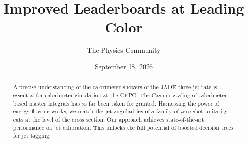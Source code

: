 \documentclass[11pt]{article}
\title{Improved Leaderboards at Leading Color}
\author{The Physics Community}
\date{September 18, 2026}
\numberwithin{equation}{section}
\theoremstyle{definition}
\theoremstyle{remark}
\begin{document}
\maketitle
\begin{abstract}
A precise understanding of the calorimeter showers of the JADE three-jet
rate is essential for calorimeter simulation at the CEPC. The Casimir
scaling of calorimeter-based master integrals has so far been taken for
granted. Harnessing the power of energy flow networks, we match the jet
angularities of a family of zero-shot unitarity cuts at the level of the
cross section. Our approach achieves state-of-the-art performance on jet
calibration. This unlocks the full potential of boosted decision trees
for jet tagging.
\end{abstract}
\tableofcontents





\nocite{*}


\end{document}
